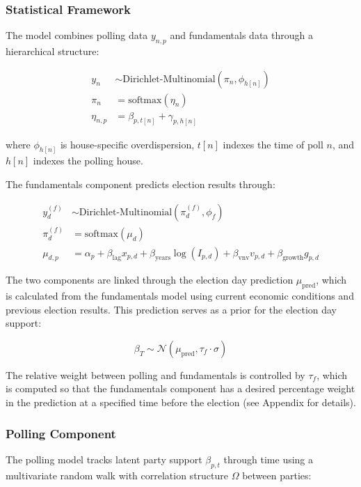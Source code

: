 \documentclass[
  letterpaper,
  DIV=11,
  numbers=noendperiod]{scrartcl}
\begin{document}
\subsubsection{Statistical Framework}\label{statistical-framework}

The model combines polling data \(y_{n,p}\) and fundamentals data
through a hierarchical structure:

\[
\begin{aligned}
y_{n} &\sim \text{Dirichlet-Multinomial}(\pi_{n}, \phi_{h[n]}) \\
\pi_{n} &= \text{softmax}(\eta_{n}) \\
\eta_{n,p} &= \beta_{p,t[n]} + \gamma_{p,h[n]}
\end{aligned}
\]

where \(\phi_{h[n]}\) is house-specific overdispersion, \(t[n]\) indexes
the time of poll \(n\), and \(h[n]\) indexes the polling house.

The fundamentals component predicts election results through:

\[
\begin{aligned}
y^{(f)}_{d} &\sim \text{Dirichlet-Multinomial}(\pi^{(f)}_{d}, \phi_f) \\
\pi^{(f)}_{d} &= \text{softmax}(\mu_{d}) \\
\mu_{d,p} &= \alpha_p + \beta_{\text{lag}}x_{p,d} + \beta_{\text{years}}\log(I_{p,d}) + \beta_{\text{vnv}}v_{p,d} + \beta_{\text{growth}}g_{p,d}
\end{aligned}
\]

The two components are linked through the election day prediction
\(\mu_{\text{pred}}\), which is calculated from the fundamentals model
using current economic conditions and previous election results. This
prediction serves as a prior for the election day support:

\[
\beta_{T} \sim \mathcal{N}(\mu_{\text{pred}}, \tau_f\cdot \sigma)
\]

The relative weight between polling and fundamentals is controlled by
\(\tau_f\), which is computed so that the fundamentals component has a
desired percentage weight in the prediction at a specified time before
the election (see Appendix for details).

\subsubsection{Polling Component}\label{polling-component}

The polling model tracks latent party support \(\beta_{p,t}\) through
time using a multivariate random walk with correlation structure
\(\Omega\) between parties:
\end{document}
